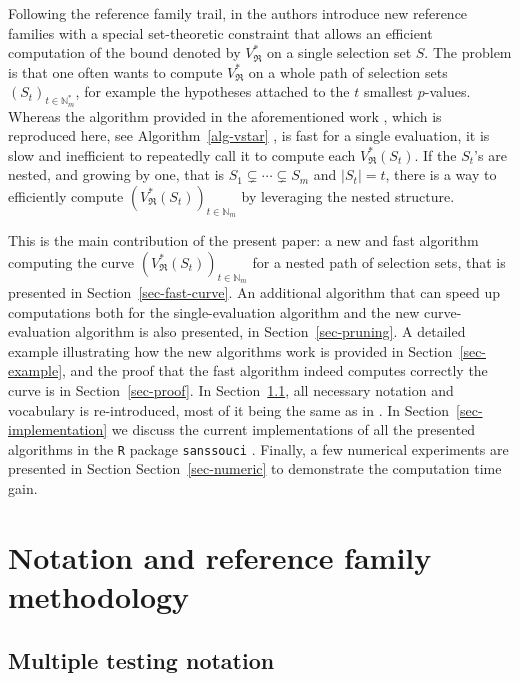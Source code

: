 \documentclass[
  11pt,
  a4paper,
]{article}
\theoremstyle{plain}
\theoremstyle{plain}
\theoremstyle{plain}
\theoremstyle{definition}
\theoremstyle{definition}
\theoremstyle{remark}
\begin{document}
Following the reference family trail, in \citet{MR4178188} the authors
introduce new reference families with a special set-theoretic constraint
that allows an efficient computation of the bound denoted by
\(V^*_{\mathfrak{R}}\) on a single selection set \(S\). The problem is
that one often wants to compute \(V^*_{\mathfrak{R}}\) on a whole path
of selection sets \((S_t)_{t\in\mathbb{N}_m^*}\), for example the
hypotheses attached to the \(t\) smallest \(p\)-values. Whereas the
algorithm provided in the aforementioned work \citep[Algorithm
1]{MR4178188}, which is reproduced here, see
 Algorithm~\ref{alg-vstar} , is fast for a single evaluation, it is slow
and inefficient to repeatedly call it to compute each
\(V^*_{\mathfrak{R}}(S_t)\). If the \(S_t\)'s are nested, and growing by
one, that is \(S_1\subsetneq\dotsb\subsetneq S_m\) and \(|S_t|=t\),
there is a way to efficiently compute
\(\left(V^*_{\mathfrak{R}}(S_t)\right)_{t\in\mathbb{N}_m}\) by
leveraging the nested structure.

This is the main contribution of the present paper: a new and fast
algorithm computing the curve
\(\left(V^*_{\mathfrak{R}}(S_t)\right)_{t\in\mathbb{N}_m}\) for a nested
path of selection sets, that is presented in
Section~\ref{sec-fast-curve}. An additional algorithm that can speed up
computations both for the single-evaluation algorithm and the new
curve-evaluation algorithm is also presented, in
Section~\ref{sec-pruning}. A detailed example illustrating how the new
algorithms work is provided in Section~\ref{sec-example}, and the proof
that the fast algorithm indeed computes correctly the curve is in
Section~\ref{sec-proof}. In Section~\ref{sec-notation}, all necessary
notation and vocabulary is re-introduced, most of it being the same as
in \citet{MR4178188}. In Section~\ref{sec-implementation} we discuss the
current implementations of all the presented algorithms in the
\texttt{R} \citep{R-base} package \texttt{sanssouci} \citep{sanssouci}.
Finally, a few numerical experiments are presented in Section
Section~\ref{sec-numeric} to demonstrate the computation time gain.

\section{Notation and reference family
methodology}\label{notation-and-reference-family-methodology}

\subsection{Multiple testing notation}\label{sec-notation}
\end{document}
